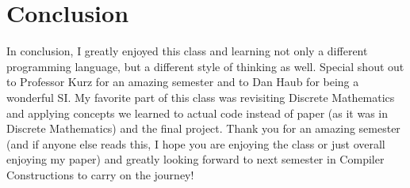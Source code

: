 \documentclass{article}
\begin{document}
\section{Conclusion}\label{conclusion}
In conclusion, I greatly enjoyed this class and learning not only a different programming language, but a different style of thinking as well. Special shout out to Professor Kurz for an amazing semester and to Dan Haub for being a wonderful SI. My favorite part of this class was revisiting Discrete Mathematics and applying concepts we learned to actual code instead of paper (as it was in Discrete Mathematics) and the final project. Thank you for an amazing semester (and if anyone else reads this, I hope you are enjoying the class or just overall enjoying my paper) and greatly looking forward to next semester in Compiler Constructions to carry on the journey!
\end{document}
